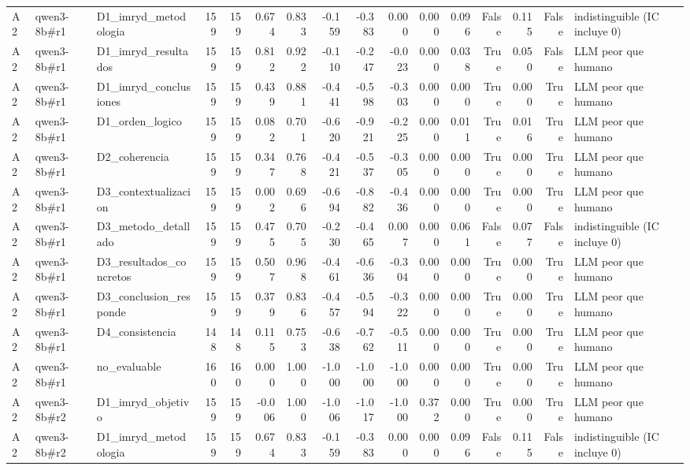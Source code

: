 \begin{table}
{\begin{tabular}{lllrrrrrrrrrrrrl}
A2 & qwen3-8b\#r1 & D1\_imryd\_metodologia & 159 & 159 & 0.674 & 0.833 & -0.159 & -0.383 & 0.000 & 0.000 & 0.096 & False & 0.115 & False & indistinguible (IC incluye 0) \\
A2 & qwen3-8b\#r1 & D1\_imryd\_resultados & 159 & 159 & 0.812 & 0.922 & -0.110 & -0.247 & -0.023 & 0.000 & 0.038 & True & 0.050 & False & LLM peor que humano \\
A2 & qwen3-8b\#r1 & D1\_imryd\_conclusiones & 159 & 159 & 0.439 & 0.881 & -0.441 & -0.598 & -0.303 & 0.000 & 0.000 & True & 0.000 & True & LLM peor que humano \\
A2 & qwen3-8b\#r1 & D1\_orden\_logico & 159 & 159 & 0.082 & 0.701 & -0.620 & -0.921 & -0.225 & 0.000 & 0.011 & True & 0.016 & True & LLM peor que humano \\
A2 & qwen3-8b\#r1 & D2\_coherencia & 159 & 159 & 0.347 & 0.768 & -0.421 & -0.537 & -0.305 & 0.000 & 0.000 & True & 0.000 & True & LLM peor que humano \\
A2 & qwen3-8b\#r1 & D3\_contextualizacion & 159 & 159 & 0.002 & 0.696 & -0.694 & -0.882 & -0.436 & 0.000 & 0.000 & True & 0.000 & True & LLM peor que humano \\
A2 & qwen3-8b\#r1 & D3\_metodo\_detallado & 159 & 159 & 0.475 & 0.705 & -0.230 & -0.465 & 0.007 & 0.000 & 0.061 & False & 0.077 & False & indistinguible (IC incluye 0) \\
A2 & qwen3-8b\#r1 & D3\_resultados\_concretos & 159 & 159 & 0.507 & 0.968 & -0.461 & -0.636 & -0.304 & 0.000 & 0.000 & True & 0.000 & True & LLM peor que humano \\
A2 & qwen3-8b\#r1 & D3\_conclusion\_responde & 159 & 159 & 0.379 & 0.836 & -0.457 & -0.594 & -0.322 & 0.000 & 0.000 & True & 0.000 & True & LLM peor que humano \\
A2 & qwen3-8b\#r1 & D4\_consistencia & 148 & 148 & 0.115 & 0.753 & -0.638 & -0.762 & -0.511 & 0.000 & 0.000 & True & 0.000 & True & LLM peor que humano \\
A2 & qwen3-8b\#r1 & no\_evaluable & 160 & 160 & 0.000 & 1.000 & -1.000 & -1.000 & -1.000 & 0.000 & 0.000 & True & 0.000 & True & LLM peor que humano \\
A2 & qwen3-8b\#r2 & D1\_imryd\_objetivo & 159 & 159 & -0.006 & 1.000 & -1.006 & -1.017 & -1.000 & 0.372 & 0.000 & True & 0.000 & True & LLM peor que humano \\
A2 & qwen3-8b\#r2 & D1\_imryd\_metodologia & 159 & 159 & 0.674 & 0.833 & -0.159 & -0.383 & 0.000 & 0.000 & 0.096 & False & 0.115 & False & indistinguible (IC incluye 0) \\

\end{tabular}}
\end{table}

